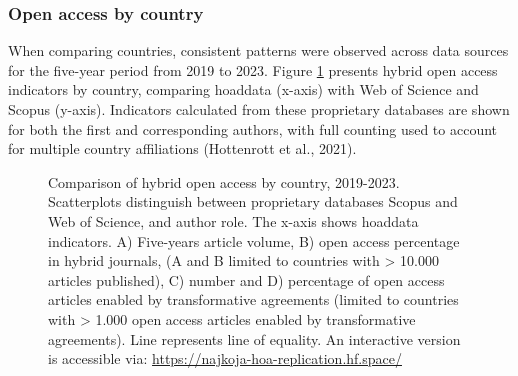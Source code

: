 \documentclass[a4paper,man,floatsintext,longtable,noextraspace,10pt]{apa6}
\begin{document}
\subsubsection{Open access by country}\label{open-access-by-country}

When comparing countries, consistent patterns were observed across data
sources for the five-year period from 2019 to 2023. Figure
\ref{fig-uptake_country} presents hybrid open access indicators by
country, comparing hoaddata (x-axis) with Web of Science and Scopus
(y-axis). Indicators calculated from these proprietary databases are
shown for both the first and corresponding authors, with full counting
used to account for multiple country affiliations (Hottenrott et al.,
2021).

\begin{figure}[ht!]


\caption{\label{fig-uptake_country}Comparison of hybrid open access by
country, 2019-2023. Scatterplots distinguish between proprietary
databases Scopus and Web of Science, and author role. The x-axis shows
hoaddata indicators. A) Five-years article volume, B) open access
percentage in hybrid journals, (A and B limited to countries with
\textgreater{} 10.000 articles published), C) number and D) percentage
of open access articles enabled by transformative agreements (limited to
countries with \textgreater{} 1.000 open access articles enabled by
transformative agreements). Line represents line of equality. An
interactive version is accessible via:
\url{https://najkoja-hoa-replication.hf.space/}}

\end{figure}%
\end{document}
